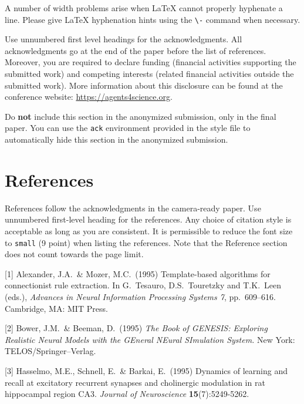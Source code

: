 \documentclass{article}
\begin{document}
A number of width problems arise when \LaTeX{} cannot properly hyphenate a
line. Please give LaTeX hyphenation hints using the \verb+\-+ command when
necessary.

\begin{ack}
Use unnumbered first level headings for the acknowledgments. All acknowledgments
go at the end of the paper before the list of references. Moreover, you are required to declare
funding (financial activities supporting the submitted work) and competing interests (related financial activities outside the submitted work).
More information about this disclosure can be found at the conference website: \url{https://agents4science.org}.


Do {\bf not} include this section in the anonymized submission, only in the final paper. You can use the \texttt{ack} environment provided in the style file to automatically hide this section in the anonymized submission.
\end{ack}

\section*{References}


References follow the acknowledgments in the camera-ready paper. Use unnumbered first-level heading for
the references. Any choice of citation style is acceptable as long as you are
consistent. It is permissible to reduce the font size to \verb+small+ (9 point)
when listing the references.
Note that the Reference section does not count towards the page limit.
\medskip


{
\small


[1] Alexander, J.A.\ \& Mozer, M.C.\ (1995) Template-based algorithms for
connectionist rule extraction. In G.\ Tesauro, D.S.\ Touretzky and T.K.\ Leen
(eds.), {\it Advances in Neural Information Processing Systems 7},
pp.\ 609--616. Cambridge, MA: MIT Press.


[2] Bower, J.M.\ \& Beeman, D.\ (1995) {\it The Book of GENESIS: Exploring
  Realistic Neural Models with the GEneral NEural SImulation System.}  New York:
TELOS/Springer--Verlag.


[3] Hasselmo, M.E., Schnell, E.\ \& Barkai, E.\ (1995) Dynamics of learning and
recall at excitatory recurrent synapses and cholinergic modulation in rat
hippocampal region CA3. {\it Journal of Neuroscience} {\bf 15}(7):5249-5262.
}

\appendix
\end{document}
